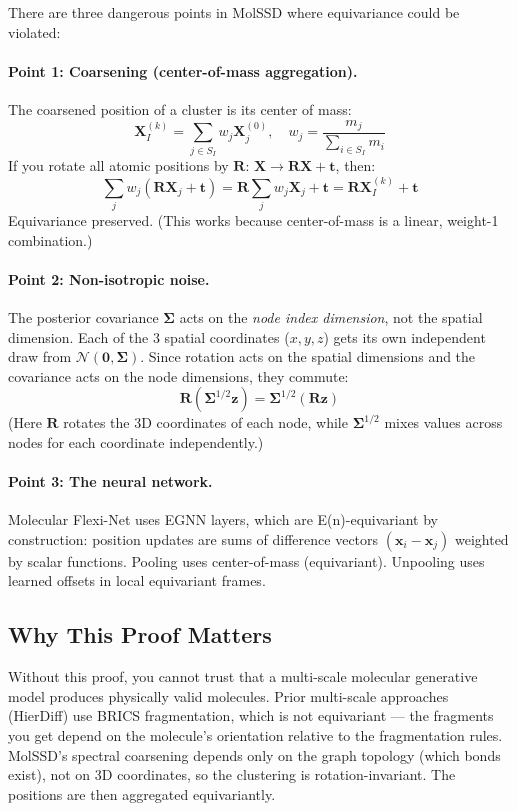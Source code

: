 \documentclass[12pt,a4paper]{article}
\newcommand{\cN}{\mathcal{N}}
\begin{document}
There are three dangerous points in MolSSD where equivariance could be violated:

\paragraph{Point 1: Coarsening (center-of-mass aggregation).} The coarsened position of a cluster is its center of mass:
\[
\bm{X}^{(k)}_I = \sum_{j \in S_I} w_j \bm{X}^{(0)}_j, \quad w_j = \frac{m_j}{\sum_{i \in S_I} m_i}
\]
If you rotate all atomic positions by $\bm{R}$: $\bm{X} \to \bm{R}\bm{X} + \bm{t}$, then:
\[
\sum_{j} w_j (\bm{R} \bm{X}_j + \bm{t}) = \bm{R} \sum_j w_j \bm{X}_j + \bm{t} = \bm{R} \bm{X}^{(k)}_I + \bm{t}
\]
Equivariance preserved. (This works because center-of-mass is a linear, weight-1 combination.)

\paragraph{Point 2: Non-isotropic noise.} The posterior covariance $\bm{\Sigma}$ acts on the \emph{node index dimension}, not the spatial dimension. Each of the 3 spatial coordinates ($x, y, z$) gets its own independent draw from $\cN(\bm{0}, \bm{\Sigma})$. Since rotation acts on the spatial dimensions and the covariance acts on the node dimensions, they commute:
\[
\bm{R}(\bm{\Sigma}^{1/2} \bm{z}) = \bm{\Sigma}^{1/2} (\bm{R} \bm{z})
\]
(Here $\bm{R}$ rotates the 3D coordinates of each node, while $\bm{\Sigma}^{1/2}$ mixes values across nodes for each coordinate independently.)

\paragraph{Point 3: The neural network.} Molecular Flexi-Net uses EGNN layers, which are E(n)-equivariant by construction: position updates are sums of difference vectors $(\bm{x}_i - \bm{x}_j)$ weighted by scalar functions. Pooling uses center-of-mass (equivariant). Unpooling uses learned offsets in local equivariant frames.

\subsection{Why This Proof Matters}

Without this proof, you cannot trust that a multi-scale molecular generative model produces physically valid molecules. Prior multi-scale approaches (HierDiff) use BRICS fragmentation, which is not equivariant --- the fragments you get depend on the molecule's orientation relative to the fragmentation rules. MolSSD's spectral coarsening depends only on the graph topology (which bonds exist), not on 3D coordinates, so the clustering is rotation-invariant. The positions are then aggregated equivariantly.
\end{document}
